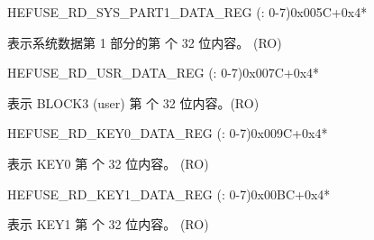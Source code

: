 \begin{register}{H}{EFUSE\_RD\_SYS\_PART1\_DATA\_REG (: 0-7)}{0x005C+0x4*}\label{regdesc:EFUSERDSYSPART1DATANREG}
%
\regnewline%
\begin{regdesc}\begin{reglist}
\label{fielddesc:EFUSESYSDATAPART1N}\item [EFUSE\_SYS\_DATA\_PART1\_\regindex{n}] 表示系统数据第 1 部分的第   个 32 位内容。 (RO)
\end{reglist}\end{regdesc}
\end{register}


\begin{register}{H}{EFUSE\_RD\_USR\_DATA\_REG (: 0-7)}{0x007C+0x4*}\label{regdesc:EFUSERDUSRDATAMREG}
%
\regnewline%
\begin{regdesc}\begin{reglist}
\label{fielddesc:EFUSEUSRDATAM}\item [EFUSE\_USR\_DATA\regindex{m}] 表示 BLOCK3 (user) 第  个 32 位内容。(RO)
\end{reglist}\end{regdesc}
\end{register}


\begin{register}{H}{EFUSE\_RD\_KEY0\_DATA\_REG (: 0-7)}{0x009C+0x4*}\label{regdesc:EFUSERDKEY0DATANREG}
%
\regnewline%
\begin{regdesc}\begin{reglist}
\label{fielddesc:EFUSEKEY0DATAN}\item [EFUSE\_KEY0\_DATA\regindex{n}] 表示 KEY0 第  个 32 位内容。 (RO)
\end{reglist}\end{regdesc}
\end{register}


\begin{register}{H}{EFUSE\_RD\_KEY1\_DATA\_REG (: 0-7)}{0x00BC+0x4*}\label{regdesc:EFUSERDKEY1DATAMREG}
%
\regnewline%
\begin{regdesc}\begin{reglist}
\label{fielddesc:EFUSEKEY1DATAM}\item [EFUSE\_KEY1\_DATA\regindex{m}] 表示 KEY1 第  个 32 位内容。 (RO)
\end{reglist}\end{regdesc}
\end{register}


